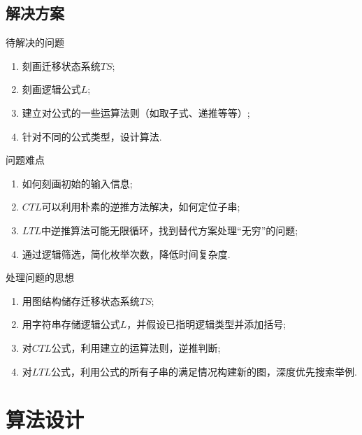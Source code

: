 \documentclass[english]{pkuslide}
\begin{document}
\subsection{解决方案}
\begin{frame}{待解决的问题}
\begin{enumerate}[<+->]
\item 刻画迁移状态系统$TS$;
\item 刻画逻辑公式$L$;
\item 建立对公式的一些运算法则（如取子式、递推等等）;
\item 针对不同的公式类型，设计算法.
\end{enumerate}
\end{frame}
\begin{frame}{问题难点}
\begin{enumerate}
\item 如何刻画初始的输入信息;
\item $CTL$可以利用朴素的逆推方法解决，如何定位子串;
\item $LTL$中逆推算法可能无限循环，找到替代方案处理“无穷”的问题;
\item 通过逻辑筛选，简化枚举次数，降低时间复杂度.
\end{enumerate}
\end{frame}
\begin{frame}{处理问题的思想}
\begin{enumerate}
\item 用图结构储存迁移状态系统$TS$;
\item 用字符串存储逻辑公式$L$，并假设已指明逻辑类型并添加括号;
\item 对$CTL$公式，利用建立的运算法则，逆推判断;
\item 对$LTL$公式，利用公式的所有子串的满足情况构建新的图，深度优先搜索举例.
\end{enumerate}
\end{frame}

\section{算法设计}

\frame{\sectionpage}
\end{document}
